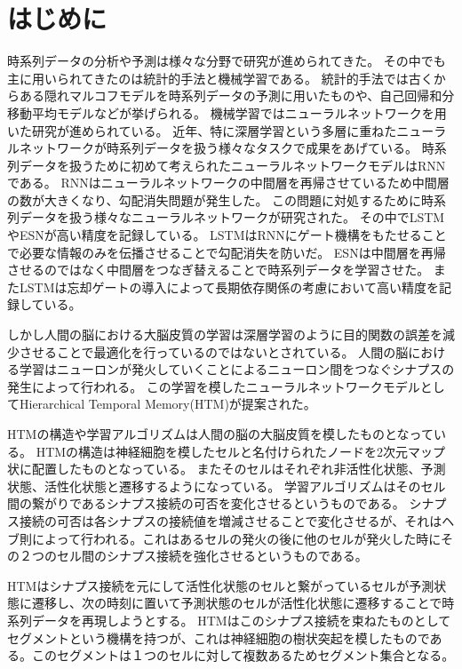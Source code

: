 \chapter{はじめに}
時系列データの分析や予測は様々な分野で研究が進められてきた。
その中でも主に用いられてきたのは統計的手法と機械学習である。
統計的手法では古くからある隠れマルコフモデル\cite{hmm_original}を時系列データの予測に用いたもの\cite{hmm}や、自己回帰和分移動平均モデル\cite{arima}などが挙げられる。
機械学習ではニューラルネットワークを用いた研究が進められている。
近年、特に深層学習という多層に重ねたニューラルネットワークが時系列データを扱う様々なタスクで成果をあげている。
時系列データを扱うために初めて考えられたニューラルネットワークモデルはRNN\cite{rnn}である。
RNNはニューラルネットワークの中間層を再帰させているため中間層の数が大きくなり、勾配消失問題が発生した。
この問題に対処するために時系列データを扱う様々なニューラルネットワークが研究された。
その中でLSTM\cite{lstm_original}やESN\cite{esn}が高い精度を記録している。
LSTMはRNNにゲート機構をもたせることで必要な情報のみを伝播させることで勾配消失を防いだ。
ESNは中間層を再帰させるのではなく中間層をつなぎ替えることで時系列データを学習させた。
またLSTMは忘却ゲートの導入\cite{lstm_forget_gate}によって長期依存関係の考慮において高い精度を記録している。

しかし人間の脳における大脳皮質の学習は深層学習のように目的関数の誤差を減少させることで最適化を行っているのではないとされている\cite{neurons}。
人間の脳における学習はニューロンが発火していくことによるニューロン間をつなぐシナプスの発生によって行われる。
この学習を模したニューラルネットワークモデルとしてHierarchical Temporal Memory(HTM)が提案された。\cite{htm}

HTMの構造や学習アルゴリズムは人間の脳の大脳皮質を模したものとなっている。
HTMの構造は神経細胞を模したセルと名付けられたノードを2次元マップ状に配置したものとなっている。
またそのセルはそれぞれ非活性化状態、予測状態、活性化状態と遷移するようになっている。
学習アルゴリズムはそのセル間の繋がりであるシナプス接続の可否を変化させるというものである。
シナプス接続の可否は各シナプスの接続値を増減させることで変化させるが、それはヘブ則によって行われる。これはあるセルの発火の後に他のセルが発火した時にその２つのセル間のシナプス接続を強化させるというものである。

HTMはシナプス接続を元にして活性化状態のセルと繋がっているセルが予測状態に遷移し、次の時刻に置いて予測状態のセルが活性化状態に遷移することで時系列データを再現しようとする。
HTMはこのシナプス接続を束ねたものとしてセグメントという機構を持つが、これは神経細胞の樹状突起を模したものである。このセグメントは１つのセルに対して複数あるためセグメント集合となる。

